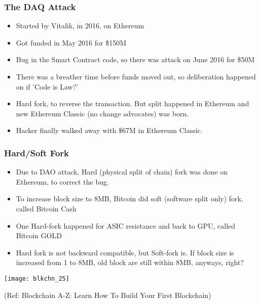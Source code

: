 \begin{frame}[fragile]\frametitle{The DAQ Attack}

\begin{itemize}
\item Started by Vitalik, in 2016, on Ethereum
\item Got funded in May 2016 for \$150M
\item Bug in the Smart Contract code, so there was attack on June 2016 for \$50M
\item There was a breather time before funds moved out, so deliberation happened on if 'Code is Law?'
\item Hard fork, to reverse the transaction. But split happened in Ethereum and new Ethereum Classic (no change advocates) was born.
\item Hacker finally walked away with \$67M in Ethereum Classic.
\end{itemize}


\end{frame}

\begin{frame}[fragile]\frametitle{Hard/Soft Fork}

\begin{itemize}
\item Due to DAO attack, Hard (physical split of chain) fork was done on Ethereum, to correct the bug.
\item To increase block size to 8MB, Bitcoin did soft (software split only) fork, called Bitcoin Cash
\item One Hard-fork happened for ASIC resistance and back to GPU, called Bitcoin GOLD
\item Hard fork is not backward compatible, but Soft-fork is. If block size is increased from 1 to 8MB, old block are still within 8MB, anyways, right?
\end{itemize}

\begin{center}
\texttt{[image: blkchn\_25]}

{\tiny (Ref: Blockchain A-Z: Learn How To Build Your First Blockchain)}
\end{center}

\end{frame}

